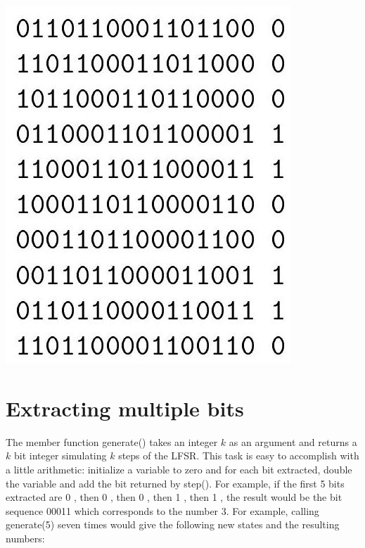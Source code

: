 \documentclass[10pt]{article}
\begin{document}
\begin{center}
\includegraphics[max width=\textwidth]{2024_03_21_ddd7c97e7fb9b272aea0g-3}
\end{center}

\section*{Extracting multiple bits}
The member function generate() takes an integer $k$ as an argument and returns a $k$ bit integer simulating $k$ steps of the LFSR. This task is easy to accomplish with a little arithmetic: initialize a variable to zero and for each bit extracted, double the variable and add the bit returned by step(). For example, if the first 5 bits extracted are 0 , then 0 , then 0 , then 1 , then 1 , the result would be the bit sequence 00011 which corresponds to the number 3. For example, calling generate(5) seven times would give the following new states and the resulting numbers:
\end{document}
